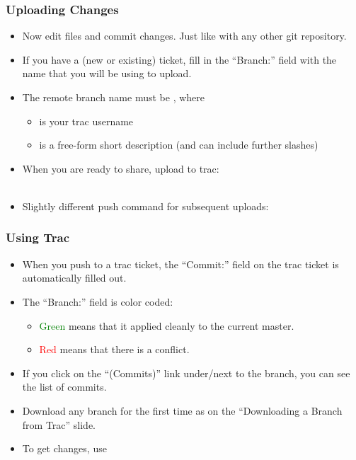 \begin{frame}
  \frametitle{Uploading Changes}

  \begin{itemize}
  \item<1-> Now edit files and commit changes. Just like with any other git
    repository.
  \item<2-> If you have a (new or existing) ticket, fill in the
    ``Branch:'' field with the name that you will be using to upload.
  \item<3-> The remote branch name must be , where
    \begin{itemize}
    \item<3->  is your trac username
    \item<3->  is a free-form short description (and can
      include further slashes)
    \end{itemize}
  \item<4-> 
    When you are ready to share, upload to trac:\\
    \\
    \hspace{2cm}
  \item<5->
    Slightly different push command for subsequent uploads:\\
  \end{itemize}
\end{frame}



\begin{frame}
  \frametitle{Using Trac}

  \begin{itemize}
  \item<1-> When you push to a trac ticket, the ``Commit:'' field on the
    trac ticket is automatically filled out.
  \item<2-> The ``Branch:'' field is color coded:
    \begin{itemize}
    \item \textcolor{green}{Green} means that it applied cleanly to the current master.
    \item \textcolor{red}{Red} means that there is a conflict.
    \end{itemize}
  \item<3-> If you click on the ``(Commits)'' link under/next to the
    branch, you can see the list of commits.
  \item<4-> Download any branch for the first time as on the ``Downloading
    a Branch from Trac'' slide.
  \item<5-> To get changes, use 
  \end{itemize}
\end{frame}


